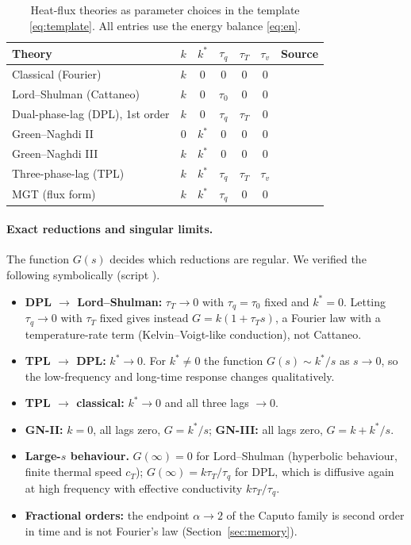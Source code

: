 \begin{table}[ht]\centering\small
\caption{Heat-flux theories as parameter choices in the template \eqref{eq:template}. All entries use the energy balance \eqref{eq:en}.}\label{tab:param}
\begin{tabular}{@{}lccccc l@{}}\toprule
Theory & $k$ & $k^*$ & $\tau_q$ & $\tau_T$ & $\tau_v$ & Source\\\midrule
Classical (Fourier) & $k$ & 0 & 0 & 0 & 0 & \citep{Biot1956}\\
Lord--Shulman (Cattaneo) & $k$ & 0 & $\tau_0$ & 0 & 0 & \citep{Lord1967,Cattaneo1948,Vernotte1958}\\
Dual-phase-lag (DPL), 1st order & $k$ & 0 & $\tau_q$ & $\tau_T$ & 0 & \citep{Tzou1995,Tzou1997}\\
Green--Naghdi II & 0 & $k^*$ & 0 & 0 & 0 & \citep{Green1993}\\
Green--Naghdi III & $k$ & $k^*$ & 0 & 0 & 0 & \citep{Green1991}\\
Three-phase-lag (TPL) & $k$ & $k^*$ & $\tau_q$ & $\tau_T$ & $\tau_v$ & \citep{RoyChoudhuri2007}\\
MGT (flux form) & $k$ & $k^*$ & $\tau_q$ & 0 & 0 & \citep{Quintanilla2019}\\\bottomrule
\end{tabular}
\end{table}

\paragraph{Exact reductions and singular limits.} The function $G(s)$ decides which reductions are regular. We verified the following symbolically (script ).
\begin{itemize}
\item \textbf{DPL $\to$ Lord--Shulman:} $\tau_T\to0$ with $\tau_q=\tau_0$ fixed and $k^*=0$. Letting $\tau_q\to0$ with $\tau_T$ fixed gives instead $G=k(1+\tau_Ts)$, a Fourier law with a temperature-rate term (Kelvin--Voigt-like conduction), not Cattaneo.
\item \textbf{TPL $\to$ DPL:} $k^*\to0$. For $k^*\ne0$ the function $G(s)\sim k^*/s$ as $s\to0$, so the low-frequency and long-time response changes qualitatively.
\item \textbf{TPL $\to$ classical:} $k^*\to0$ and all three lags $\to0$.
\item \textbf{GN-II:} $k=0$, all lags zero, $G=k^*/s$; \textbf{GN-III:} all lags zero, $G=k+k^*/s$.
\item \textbf{Large-$s$ behaviour.} $G(\infty)=0$ for Lord--Shulman (hyperbolic behaviour, finite thermal speed $c_T$); $G(\infty)=k\tau_T/\tau_q$ for DPL, which is diffusive again at high frequency with effective conductivity $k\tau_T/\tau_q$.
\item \textbf{Fractional orders:} the endpoint $\alpha\to2$ of the Caputo family is second order in time and is not Fourier's law (Section~\ref{sec:memory}).
\end{itemize}

